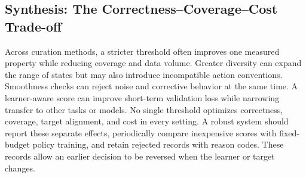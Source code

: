 \subsection{Synthesis: The Correctness--Coverage--Cost Trade-off}

Across curation methods, a stricter threshold often improves one measured property while reducing coverage and data volume.
Greater diversity can expand the range of states but may also introduce incompatible action conventions.
Smoothness checks can reject noise and corrective behavior at the same time.
A learner-aware score can improve short-term validation loss while narrowing transfer to other tasks or models.
No single threshold optimizes correctness, coverage, target alignment, and cost in every setting.
A robust system should report these separate effects, periodically compare inexpensive scores with fixed-budget policy training, and retain rejected records with reason codes.
These records allow an earlier decision to be reversed when the learner or target changes.
